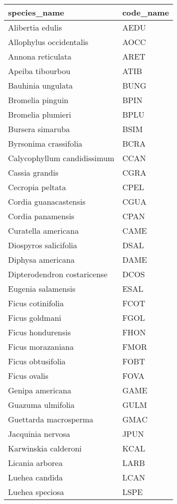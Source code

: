 \documentclass{article}\usepackage[]{graphicx}\usepackage[]{color}
\begin{document}
\begin{longtable}{ll}
  \hline
species\_name & code\_name \\ 
  \hline
Alibertia edulis & AEDU \\ 
  Allophylus occidentalis & AOCC \\ 
  Annona reticulata & ARET \\ 
  Apeiba tibourbou & ATIB \\ 
  Bauhinia ungulata & BUNG \\ 
  Bromelia pinguin & BPIN \\ 
  Bromelia plumieri & BPLU \\ 
  Bursera simaruba & BSIM \\ 
  Byrsonima crassifolia & BCRA \\ 
  Calycophyllum candidissimum & CCAN \\ 
  Cassia grandis & CGRA \\ 
  Cecropia peltata & CPEL \\ 
  Cordia guanacastensis & CGUA \\ 
  Cordia panamensis & CPAN \\ 
  Curatella americana & CAME \\ 
  Diospyros salicifolia & DSAL \\ 
  Diphysa americana & DAME \\ 
  Dipterodendron costaricense & DCOS \\ 
  Eugenia salamensis & ESAL \\ 
  Ficus cotinifolia & FCOT \\ 
  Ficus goldmani & FGOL \\ 
  Ficus hondurensis & FHON \\ 
  Ficus morazaniana & FMOR \\ 
  Ficus obtusifolia & FOBT \\ 
  Ficus ovalis & FOVA \\ 
  Genipa americana & GAME \\ 
  Guazuma ulmifolia & GULM \\ 
  Guettarda macrosperma & GMAC \\ 
  Jacquinia nervosa & JPUN \\ 
  Karwinskia calderoni & KCAL \\ 
  Licania arborea & LARB \\ 
  Luehea candida & LCAN \\ 
  Luehea speciosa & LSPE \\ 

\end{longtable}
\end{document}
